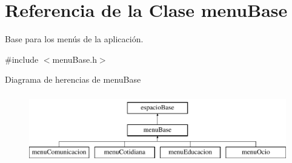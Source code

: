 \hypertarget{classmenu_base}{}\section{Referencia de la Clase menu\+Base}
\label{classmenu_base}


Base para los menús de la aplicación.  




{\ttfamily \#include $<$menu\+Base.\+h$>$}

Diagrama de herencias de menu\+Base\begin{figure}[H]
\begin{center}
\leavevmode
\includegraphics[height=3.000000cm]{classmenu_base}
\end{center}
\end{figure}
